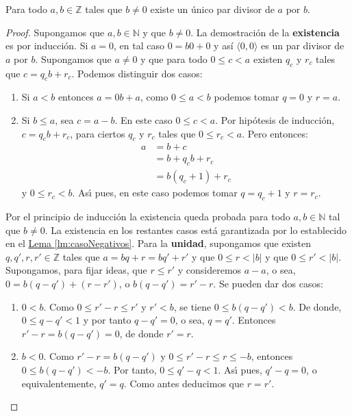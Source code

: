 \begin{theorem}
  \label{th:teoremaDeLaDivision}  Para
  todo $a,b\in\mathbb{Z}$ tales que $b\neq 0$ existe un único par
  divisor de $a$ por $b$.
\end{theorem}

\begin{proof}
  Supongamos que $a,b\in\mathbb{N}$ y que $b\neq 0$. La demostraci\'on
  de la \textbf{existencia} es por inducci\'on. Si $a=0$, en tal caso
  $0=b0+0$ y así $\langle 0,0\rangle$ es un par divisor de $a$ por
  $b$. Supongamos que $a\neq 0$ y que para todo $0\leq c<a$ existen
  $q_{c}$ y $r_{c}$ tales que $c=q_{c}b+r_{c}$. Podemos distinguir dos
  casos:
  \begin{enumerate}
  \item Si $a<b$ entonces $a=0b+a$, como $0\leq a<b$ podemos tomar $q=0$
    y $r=a$.
  \item Si $b\leq a$, sea $c=a-b$. En este caso $0\leq c<a$. Por
    hip\'otesis de inducci\'on, $c=q_{c}b+r_{c}$, para ciertos $q_{c}$ y
    $r_{c}$ tales que $0\leq r_{c}<a$. Pero entonces:
    \begin{align*}
      a&=b+c\\
       &=b+q_{c}b+r_{c}\\
       &=b(q_{c}+1)+r_{c}
    \end{align*}
    y $0\leq r_{c}<b$. As\'{\i} pues, en este caso podemos tomar
    $q=q_{c}+1$ y $r=r_{c}$.
  \end{enumerate}
  Por el principio de inducci\'on la existencia queda probada para
  todo $a,b\in\mathbb{N}$ tal que $b\neq 0$. La existencia en los
  restantes casos está garantizada por lo establecido en el
  \hyperref[lm:casoNegativos]{Lema \ref*{lm:casoNegativos}}. Para la
  \textbf{unidad}, supongamos que existen $q,q',r,r'\in \mathbb{Z}$
  tales que $a=bq+r=bq'+r'$ y que $0\leq r<|b|$ y que $0\leq
  r'<|b|$. Supongamos, para fijar ideas, que $r\leq r'$ y consideremos
  $a-a$, o sea, $0=b(q-q')+(r-r')$, o $b(q-q')=r'-r$. Se pueden dar
  dos casos:
  \begin{enumerate}
  \item $0<b$. Como $0\leq r'-r\leq r'$ y $r'<b$, se tiene $0\leq
    b(q-q')<b$. De donde, $0\leq q-q'<1$ y por tanto $q-q'=0$, o sea,
    $q=q'$. Entonces $r'-r=b(q-q')=0$, de donde $r'=r$.
  \item $b<0$. Como $r'-r=b(q-q')$ y $0\leq r'-r\leq r\leq -b$, entonces
    $0\leq b(q-q')<-b$. Por tanto, $0\leq q'-q<1$. As\'{\i} pues,
    $q'-q=0$, o equivalentemente, $q'=q$. Como antes deducimos que
    $r=r'$.
  \end{enumerate}
\end{proof}


